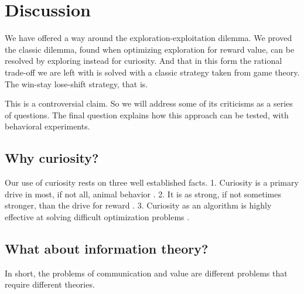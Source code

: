 % 



\section*{Discussion}
We have offered a way around the exploration-exploitation dilemma. We proved the classic dilemma, found when optimizing exploration for reward value, can be resolved by exploring instead for curiosity. And that in this form the rational trade-off we are left with is solved with a classic strategy taken from game theory. The win-stay lose-shift strategy, that is.

This is a controversial claim. So we will address some of its criticisms as a series of questions. The final question explains how this approach can be tested, with behavioral experiments. 

\subsection*{Why curiosity?}
Our use of curiosity rests on three well established facts. 1. Curiosity is a primary drive in most, if not all, animal behavior \cite{Inglis2001}. 2. It is as strong, if not sometimes stronger, than the drive for reward \cite{Loewenstein1994,Kidd2015,Gottlieb2018}. 3. Curiosity as an algorithm is highly effective at solving difficult optimization problems \cite{Schmidhuber1991,Pathak2017,Stanton2018,Lehman201,Mouret2011b1,Fister2019,Mouret2015,Colas2020,Cully2015,Pathak2017,Schwartenbeck2019.Laversanne-Finot2018}. 


\subsection*{What about information theory?}
In short, the problems of communication and value are different problems that require different theories.

